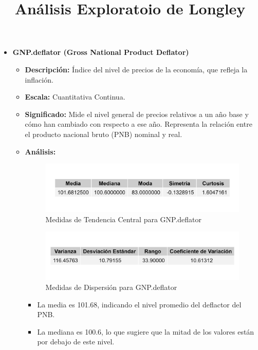 \documentclass{article}
\title{Análisis Exploratoio de Longley}
\author{}
\date{}
\begin{document}
\maketitle

\begin{itemize}
    \item \textbf{GNP.deflator (Gross National Product Deflator)}
    \begin{itemize}
        \item \textbf{Descripción:} Índice del nivel de precios de la economía, que refleja la inflación.
        \item \textbf{Escala:} Cuantitativa Continua.
        \item \textbf{Significado:} Mide el nivel general de precios relativos a un año base y cómo han cambiado con respecto a ese año. Representa la relación entre el producto nacional bruto (PNB) nominal y real.
        \item \textbf{Análisis:} 
        \begin{figure}[H]
            \centering
            \includegraphics[width=\textwidth]{MTC/GNP.deflator_central.png}
            \caption{Medidas de Tendencia Central para GNP.deflator}
        \end{figure}
        \begin{figure}[H]
            \centering
            \includegraphics[width=\textwidth]{MTC/GNP.deflator_dispersion.png}
            \caption{Medidas de Dispersión para GNP.deflator}
        \end{figure}
            \begin{itemize}
                \item La media es 101.68, indicando el nivel promedio del deflactor del PNB.
                \item La mediana es 100.6, lo que sugiere que la mitad de los valores están por debajo de este nivel.

\end{itemize}
\end{itemize}
\end{itemize}
\end{document}
